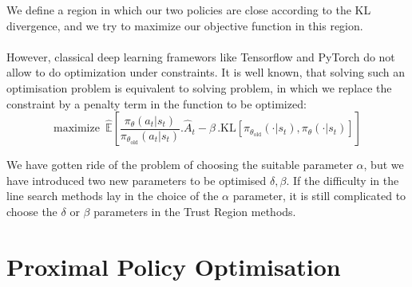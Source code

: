 \documentclass{article}
\begin{document}


We define a region in which our two policies are close according to the KL divergence, and we try to maximize our objective function in this region. \\ \\
However, classical deep learning framewors like Tensorflow and PyTorch do not allow to do optimization under constraints. It is well known, that solving such an optimisation problem is equivalent to solving problem, in which we replace the constraint by a penalty term in the function to be optimized: 
$$
\text{maximize }\,\hat{\mathbb{E}}\left[ \frac{\pi_\theta(a_t |s_t)}{\pi_{\theta_{\text{old}}}(a_t |s_t)} .\hat{A}_t - \beta \, .\text{KL}[\pi_{\theta_{\text{old}}}(\cdot | s_t), \pi_{\theta}(\cdot|s_t)] \right]
$$

 We have gotten ride of the problem of choosing the suitable parameter $\alpha$, but we have introduced two new parameters to be optimised $\delta, \beta$. If the difficulty in the line search methods lay in the choice of the $\alpha$ parameter, it is still complicated to choose the $\delta$ or $\beta$ parameters in the Trust Region methods. 
\section{Proximal Policy Optimisation}
\end{document}
